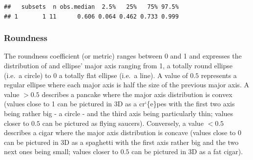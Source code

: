 \documentclass[
]{book}
\newenvironment{Shaded}{\begin{snugshade}}{\end{snugshade}}
\newcommand{\CommentTok}[1]{\textcolor[rgb]{0.56,0.35,0.01}{\textit{#1}}}
\newcommand{\ControlFlowTok}[1]{\textcolor[rgb]{0.13,0.29,0.53}{\textbf{#1}}}
\newcommand{\DataTypeTok}[1]{\textcolor[rgb]{0.13,0.29,0.53}{#1}}
\newcommand{\DecValTok}[1]{\textcolor[rgb]{0.00,0.00,0.81}{#1}}
\newcommand{\KeywordTok}[1]{\textcolor[rgb]{0.13,0.29,0.53}{\textbf{#1}}}
\newcommand{\NormalTok}[1]{#1}
\newcommand{\OperatorTok}[1]{\textcolor[rgb]{0.81,0.36,0.00}{\textbf{#1}}}
\newcommand{\OtherTok}[1]{\textcolor[rgb]{0.56,0.35,0.01}{#1}}
\newcommand{\StringTok}[1]{\textcolor[rgb]{0.31,0.60,0.02}{#1}}
\begin{document}
\begin{Shaded}
\end{Shaded}

\begin{verbatim}
##   subsets  n obs.median  2.5%   25%   75% 97.5%
## 1       1 11      0.606 0.064 0.462 0.733 0.999
\end{verbatim}

\hypertarget{roundness}{%
\subsubsection{Roundness}\label{roundness}}

The roundness coefficient (or metric) ranges between 0 and 1 and expresses the distribution of and ellipse' major axis ranging from 1, a totally round ellipse (i.e.~a circle) to 0 a totally flat ellipse (i.e.~a line). A value of \(0.5\) represents a regular ellipse where each major axis is half the size of the previous major axis. A value \(> 0.5\) describes a pancake where the major axis distribution is convex (values close to 1 can be pictured in 3D as a cr`\{e\}pes with the first two axis being rather big - a circle - and the third axis being particularly thin; values closer to \(0.5\) can be pictured as flying saucers). Conversely, a value \(< 0.5\) describes a cigar where the major axis distribution is concave (values close to 0 can be pictured in 3D as a spaghetti with the first axis rather big and the two next ones being small; values closer to \(0.5\) can be pictured in 3D as a fat cigar).
\end{document}
